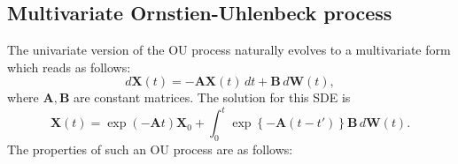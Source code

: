 \documentclass[11pt]{article}
\newcommand{\bs}{\boldsymbol}
\begin{document}
\subsection{Multivariate Ornstien-Uhlenbeck process}
The univariate version of the OU process naturally evolves to a multivariate form which reads as follows:
\begin{equation}
  d\bs{X}\left(t\right) = -\bs{A}\bs{X}\left(t\right)\,dt + \bs{B}\,d\bs{W}\left(t\right),
\end{equation}
where $\bs{A}, \bs{B}$ are constant matrices. The solution for this SDE is
\begin{equation}
  \bs{X}\left(t\right) = \exp\left(-\bs{A}t\right)\bs{X}_{0} + \int_{0}^{t}\exp\left\{-\bs{A}\left(t-t'\right) \right\}\bs{B}\,d\bs{W}\left(t\right).
\end{equation}
The properties of such an OU process are as follows:
\end{document}
